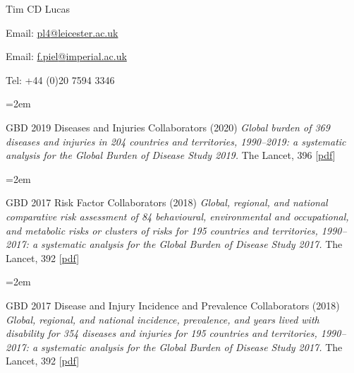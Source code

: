 \documentclass{scrartcl}
\newcommand{\MarginText}[1]{\marginpar{\raggedleft\itshape\small#1}} %
\newcommand{\Description}[1]{\hangindent=2em\hangafter=0\noindent\raggedright\footnotesize{#1}\par\normalsize\vspace{1em}} %
\begin{document}
\begin{cv}{Tim {\Large CD} Lucas}
\begin{multicols}{2}
\begin{footnotesize}
\end{footnotesize}
\end{multicols}
\vspace{-0.5cm}
\begin{multicols}{2}
\begin{footnotesize}
Email: \href{mailto:pl4@leicester.ac.uk}{pl4{\scriptsize @}leicester.ac.uk}\newline
\columnbreak


Email: \href{mailto:f.piel@imperial.ac.uk}{f.piel{\scriptsize @}imperial.ac.uk}\newline

Tel: +44 (0)20 7594 3346


\end{footnotesize}
\end{multicols}



\vspace{2em} %


{\color{Maroon}}\vspace{1em}


\Description{\MarginText{2020}GBD 2019 Diseases and Injuries Collaborators (2020) \emph{Global burden of 369 diseases and injuries in 204 countries and territories, 1990–2019: a systematic analysis for the Global Burden of Disease Study 2019.} The Lancet, 396 [\href{https://reader.elsevier.com/reader/sd/pii/S0140673618322256?token=B51BB41EDB592105E398079BFEE0CA91BB2DA80DC879A7B3CFD538DFBF8ADE6FA424858694B94E7860E6AE8461E553E7}{pdf}]}




\Description{\MarginText{2018}GBD 2017 Risk Factor Collaborators (2018) \emph{Global, regional, and national comparative risk assessment of 84 behavioural, environmental and occupational, and metabolic risks or clusters of risks for 195 countries and territories, 1990--2017: a systematic analysis for the Global Burden of Disease Study 2017.} The Lancet, 392 [\href{https://reader.elsevier.com/reader/sd/pii/S0140673618322256?token=B51BB41EDB592105E398079BFEE0CA91BB2DA80DC879A7B3CFD538DFBF8ADE6FA424858694B94E7860E6AE8461E553E7}{pdf}]}

\Description{GBD 2017 Disease and Injury Incidence and Prevalence Collaborators (2018) \emph{Global, regional, and national incidence, prevalence, and years lived with disability for 354 diseases and injuries for 195 countries and territories, 1990--2017: a systematic analysis for the Global Burden of Disease Study 2017.} The Lancet, 392 [\href{https://www.sciencedirect.com/science/article/pii/S0140673618322797/pdfft?md5=7f77aa9068dc470c4dec82747c586883&pid=1-s2.0-S0140673618322797-main.pdf}{pdf}]}



\end{cv}
\end{document}
